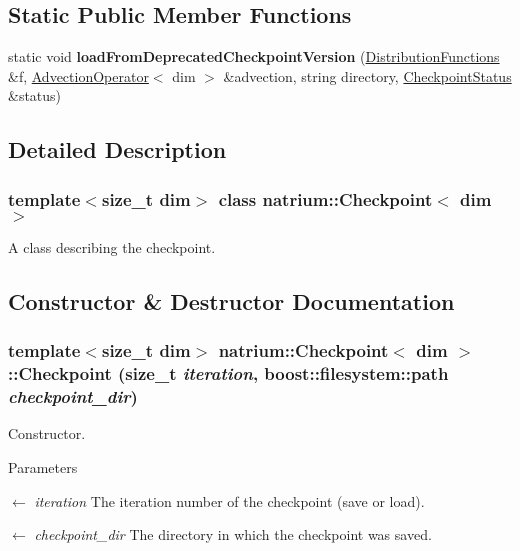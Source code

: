 \subsection*{Static Public Member Functions}
\begin{DoxyCompactItemize}
\item 
\hypertarget{classnatrium_1_1Checkpoint_a8ab0b57861be8c348efbe20bc5dec303}{
static void {\bfseries loadFromDeprecatedCheckpointVersion} (\hyperlink{classnatrium_1_1DistributionFunctions}{DistributionFunctions} \&f, \hyperlink{classnatrium_1_1AdvectionOperator}{AdvectionOperator}$<$ dim $>$ \&advection, string directory, \hyperlink{structnatrium_1_1CheckpointStatus}{CheckpointStatus} \&status)}
\label{classnatrium_1_1Checkpoint_a8ab0b57861be8c348efbe20bc5dec303}

\end{DoxyCompactItemize}


\subsection{Detailed Description}
\subsubsection*{template$<$size\_\-t dim$>$ class natrium::Checkpoint$<$ dim $>$}

A class describing the checkpoint. 

\subsection{Constructor \& Destructor Documentation}
\hypertarget{classnatrium_1_1Checkpoint_a8d5798dea2e38acce751dd1194d76c27}{
\subsubsection[{Checkpoint}]{\setlength{\rightskip}{0pt plus 5cm}template$<$size\_\-t dim$>$ {\bf natrium::Checkpoint}$<$ dim $>$::{\bf Checkpoint} (size\_\-t {\em iteration}, \/  boost::filesystem::path {\em checkpoint\_\-dir})}}
\label{classnatrium_1_1Checkpoint_a8d5798dea2e38acce751dd1194d76c27}


Constructor. 
\begin{DoxyParams}{Parameters}
\item[\mbox{$\leftarrow$} {\em iteration}]The iteration number of the checkpoint (save or load). \item[\mbox{$\leftarrow$} {\em checkpoint\_\-dir}]The directory in which the checkpoint was saved. \end{DoxyParams}


